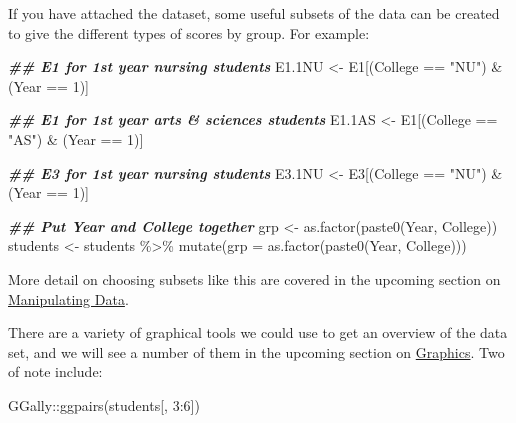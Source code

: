 \documentclass[
]{book}
\newenvironment{Shaded}{\begin{snugshade}}{\end{snugshade}}
\newcommand{\AttributeTok}[1]{\textcolor[rgb]{0.77,0.63,0.00}{#1}}
\newcommand{\DecValTok}[1]{\textcolor[rgb]{0.00,0.00,0.81}{#1}}
\newcommand{\DocumentationTok}[1]{\textcolor[rgb]{0.56,0.35,0.01}{\textbf{\textit{#1}}}}
\newcommand{\FloatTok}[1]{\textcolor[rgb]{0.00,0.00,0.81}{#1}}
\newcommand{\FunctionTok}[1]{\textcolor[rgb]{0.00,0.00,0.00}{#1}}
\newcommand{\NormalTok}[1]{#1}
\newcommand{\OtherTok}[1]{\textcolor[rgb]{0.56,0.35,0.01}{#1}}
\newcommand{\SpecialCharTok}[1]{\textcolor[rgb]{0.00,0.00,0.00}{#1}}
\newcommand{\StringTok}[1]{\textcolor[rgb]{0.31,0.60,0.02}{#1}}
\begin{document}
If you have attached the dataset, some useful subsets of the data can be created to give the different types of scores by group. For example:

\begin{Shaded}
\begin{Highlighting}[]
\DocumentationTok{\#\# E1 for 1st year nursing students}
\NormalTok{E1}\FloatTok{.1}\NormalTok{NU }\OtherTok{\textless{}{-}}\NormalTok{ E1[(College }\SpecialCharTok{==} \StringTok{"NU"}\NormalTok{) }\SpecialCharTok{\&}\NormalTok{ (Year }\SpecialCharTok{==} \DecValTok{1}\NormalTok{)]}

\DocumentationTok{\#\# E1 for 1st year arts \& sciences students}
\NormalTok{E1}\FloatTok{.1}\NormalTok{AS }\OtherTok{\textless{}{-}}\NormalTok{ E1[(College }\SpecialCharTok{==} \StringTok{"AS"}\NormalTok{) }\SpecialCharTok{\&}\NormalTok{ (Year }\SpecialCharTok{==} \DecValTok{1}\NormalTok{)]}

\DocumentationTok{\#\# E3 for 1st year nursing students}
\NormalTok{E3}\FloatTok{.1}\NormalTok{NU }\OtherTok{\textless{}{-}}\NormalTok{ E3[(College }\SpecialCharTok{==} \StringTok{"NU"}\NormalTok{) }\SpecialCharTok{\&}\NormalTok{ (Year }\SpecialCharTok{==} \DecValTok{1}\NormalTok{)]}

\DocumentationTok{\#\# Put Year and College together}
\NormalTok{grp }\OtherTok{\textless{}{-}} \FunctionTok{as.factor}\NormalTok{(}\FunctionTok{paste0}\NormalTok{(Year, College))}
\NormalTok{students }\OtherTok{\textless{}{-}}\NormalTok{ students }\SpecialCharTok{\%\textgreater{}\%} 
  \FunctionTok{mutate}\NormalTok{(}\AttributeTok{grp =} \FunctionTok{as.factor}\NormalTok{(}\FunctionTok{paste0}\NormalTok{(Year, College)))}
\end{Highlighting}
\end{Shaded}

More detail on choosing subsets like this are covered in the upcoming section on \protect\hyperlink{manipulating-data}{Manipulating Data}.

There are a variety of graphical tools we could use to get an overview of the data set, and we will see a number of them in the upcoming section on \protect\hyperlink{graphics}{Graphics}. Two of note include:

\begin{Shaded}
\begin{Highlighting}[]
\NormalTok{GGally}\SpecialCharTok{::}\FunctionTok{ggpairs}\NormalTok{(students[, }\DecValTok{3}\SpecialCharTok{:}\DecValTok{6}\NormalTok{])}
\end{Highlighting}
\end{Shaded}
\end{document}
